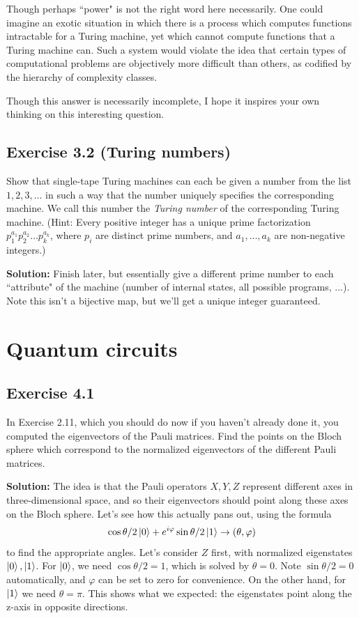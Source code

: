 \documentclass{book}
\begin{document}
    Though perhaps ``power" is not the right word here necessarily. One could imagine an exotic situation in which there is a process which computes functions intractable for a Turing machine, yet which cannot compute functions that a Turing machine can. Such a system would violate the idea that certain types of computational problems are objectively more difficult than others, as codified by the hierarchy of complexity classes.

    Though this answer is necessarily incomplete, I hope it inspires your own thinking on this interesting question.

\section*{Exercise 3.2 (Turing numbers)}
    Show that single-tape Turing machines can each be given a number from the list $1, 2, 3, \dots$ in such a way that the number uniquely specifies the corresponding machine. We call this number the \emph{Turing number} of the corresponding Turing machine. (Hint: Every positive integer has a unique prime factorization $p_1^{a_1} p_2^{a_2} \dots p_k^{a_k}$, where $p_i$ are distinct prime numbers, and $a_1, . . . , a_k$ are non-negative integers.)

    \textbf{Solution:} Finish later, but essentially give a different prime number to each ``attribute" of the machine (number of internal states, all possible programs, ...). Note this isn't a bijective map, but we'll get a unique integer guaranteed.
    

\chapter{Quantum circuits}

\section*{Exercise 4.1}
    In Exercise 2.11, which you should do now if you haven’t already done it, you computed the eigenvectors of the Pauli matrices. Find the points on the Bloch sphere which correspond to the normalized eigenvectors of the different Pauli matrices.
    
    \textbf{Solution:} The idea is that the Pauli operators $X, Y, Z$ represent different axes in three-dimensional space, and so their eigenvectors should point along these axes on the Bloch sphere. Let's see how this actually pans out, using the formula
    \begin{align} \label{eq:ket2bloch}
        \cos\theta/2 \ket{0} + e^{i\varphi}\sin\theta/2 \ket{1} \rightarrow (\theta, \varphi)
    \end{align}
    to find the appropriate angles. Let's consider $Z$ first, with normalized eigenstates $\ket{0}, \ket{1}$. For $\ket{0}$, we need $\cos\theta/2 = 1$, which is solved by $\theta = 0$. Note $\sin\theta/2 = 0$ automatically, and $\varphi$ can be set to zero for convenience. On the other hand, for $\ket{1}$ we need $\theta = \pi$. This shows what we expected: the eigenstates point along the z-axis in opposite directions.
    
\end{document}
